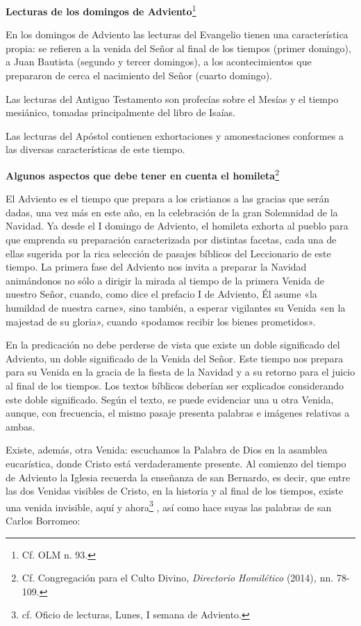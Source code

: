 \documentclass[]{article}
\begin{document}
\textbf{Lecturas de los domingos de Adviento}\footnote{Cf. OLM n. 93.}

En los domingos de Adviento las lecturas del Evangelio tienen una
característica propia: se refieren a la venida del Señor al final de los
tiempos (primer domingo), a Juan Bautista (segundo y tercer domingos), a
los acontecimientos que prepararon de cerca el nacimiento del Señor
(cuarto domingo).

Las lecturas del Antiguo Testamento son profecías sobre el Mesías y el
tiempo mesiánico, tomadas principalmente del libro de Isaías.

Las lecturas del Apóstol contienen exhortaciones y amonestaciones
conformes a las diversas características de este tiempo.

\textbf{Algunos aspectos que debe tener en cuenta el homileta}\footnote{Cf.
  Congregación para el Culto Divino, \emph{Directorio Homilético}
  (2014)\emph{,} nn. 78-109.}

El Adviento es el tiempo que prepara a los cristianos a las gracias que
serán dadas, una vez más en este año, en la celebración de la gran
Solemnidad de la Navidad. Ya desde el I domingo de Adviento, el homileta
exhorta al pueblo para que emprenda su preparación caracterizada por
distintas facetas, cada una de ellas sugerida por la rica selección de
pasajes bíblicos del Leccionario de este tiempo. La primera fase del
Adviento nos invita a preparar la Navidad animándonos no sólo a dirigir
la mirada al tiempo de la primera Venida de nuestro Señor, cuando, como
dice el prefacio I de Adviento, Él asume «la humildad de nuestra carne»,
sino también, a esperar vigilantes su Venida «en la majestad de su
gloria», cuando «podamos recibir los bienes prometidos».

En la predicación no debe perderse de vista que existe un doble
significado del Adviento, un doble significado de la Venida del Señor.
Este tiempo nos prepara para su Venida en la gracia de la fiesta de la
Navidad y a su retorno para el juicio al final de los tiempos. Los
textos bíblicos deberían ser explicados considerando este doble
significado. Según el texto, se puede evidenciar una u otra Venida,
aunque, con frecuencia, el mismo pasaje presenta palabras e imágenes
relativas a ambas.

Existe, además, otra Venida: escuchamos la Palabra de Dios en la
asamblea eucarística, donde Cristo está verdaderamente presente. Al
comienzo del tiempo de Adviento la Iglesia recuerda la enseñanza de san
Bernardo, es decir, que entre las dos Venidas visibles de Cristo, en la
historia y al final de los tiempos, existe una venida invisible, aquí y
ahora\footnote{cf. Oficio de lecturas, Lunes, I semana de Adviento.} ,
así como hace suyas las palabras de san Carlos Borromeo:
\end{document}
